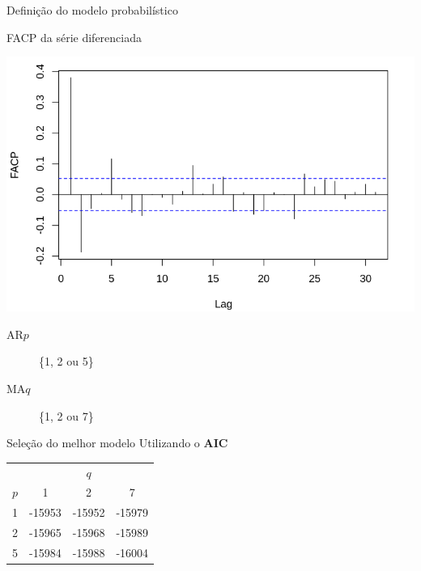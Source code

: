 \documentclass[compress,aspectratio=149,brazil]{beamer}
\begin{document}
\begin{frame}{Definição do modelo probabilístico}
    \begin{block}{FACP da série diferenciada}
        \begin{center}
            \includegraphics[width=.5\textwidth]{../images/SP500_diff_FACP.png}
        \end{center}
    \end{block}
    \begin{description}
        \item[AR\(p\)] \{1, 2 ou 5\}
        \item[MA\(q\)] \{1, 2 ou 7\}
    \end{description}
\end{frame}

\begin{frame}{Seleção do melhor modelo}
    Utilizando o \textbf{AIC}

    \begin{center}
        \begin{tabular}{l c c c}
                                & \multicolumn{3}{c}{$q$}           \\
            $p$                 & 1      & 2      & 7               \\
            \toprule
            1                   & -15953 & -15952 & -15979          \\
            2                   & -15965 & -15968 & -15989          \\
            5                   & -15984 & -15988 & \alert<2>{-16004} \\
        \end{tabular}
    \end{center}
\end{frame}
\end{document}
